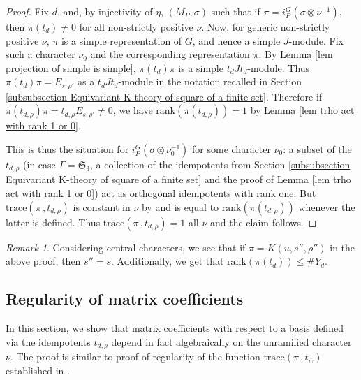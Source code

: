 \documentclass[10pt]{article}
\newcommand{\trace}[2]{\mathrm{trace}\left({#1}\,,{#2}\right)}
\newcommand{\Sn}{\mathfrak{S}}
\theoremstyle{definition}
\theoremstyle{remark}
\newtheorem{rem}{Remark}
\newcommand{\rank}{\mathrm{rank}}
\begin{document}
%
\begin{proof}
Fix $d$, and, by injectivity of $\eta$, $(M_P,\sigma)$ such that if $\pi=i_P^G(\sigma\otimes\nu^{-1})$, 
then $\pi(t_d)\neq 0$ for all non-strictly positive $\nu$.
Now, for generic non-strictly positive $\nu$, $\pi$ is a simple representation of $G$, and hence a 
simple $J$-module. Fix such a character $\nu_0$ and the corresponding representation $\pi$.
By Lemma \ref{lem projection of simple is simple}, $\pi(t_d)\pi$ is a simple $t_dJt_d$-module.
Thus $\pi(t_d)\pi=E_{s,\rho'}$ as a $t_dJt_d$-module in the 
notation recalled in Section \ref{subsubsection Equivariant K-theory of square of a finite set}.
Therefore if $\pi(t_{d,\rho})\pi= t_{d,\rho} E_{s,\rho'}\neq 0$, we have $\rank(\pi(t_{d,\rho}))=1$
by Lemma \ref{lem trho act with rank 1 or 0}.

This is thus the situation for $i_P^G(\sigma\otimes\nu_0^{-1})$ for some character $\nu_0$: a subset
of the $t_{d,\rho}$ (in case $\Gamma=\Sn_3$, a collection of the idempotents from Section \ref{subsubsection Equivariant K-theory of square of a finite set} and the proof of Lemma \ref{lem trho act with rank 1 or 0}) act as orthogonal idempotents with rank one.
But $\trace{\pi}{t_{d,\rho}}$ is constant in $\nu$ by
\cite[Lemma 5]{Plancherel} and is equal to $\rank(\pi(t_{d,\rho}))$ whenever the latter is defined. Thus $\trace{\pi}{t_{d,\rho}}=1$ all $\nu$ and the claim follows.
\end{proof}
%
\begin{rem}
\label{rem s'=s observation and rank bound}
Considering central characters, we see that if $\pi=K(u,s'',\rho'')$ in the above proof, then $s''=s$. 
Additionally, we get that $\rank(\pi(t_d))\leq \# Y_d$.
\end{rem}
%
\subsection{Regularity of matrix coefficients}
\label{subsection Regularity of matrix coefficients}
%
In this section, we show that matrix coefficients with respect to a basis defined via the idempotents
$t_{d,\rho}$ depend in fact algebraically on the unramified character $\nu$. The proof is similar to 
proof of regularity of the function $\trace{\pi}{t_w}$ established in \cite{Plancherel}.
%
\end{document}
